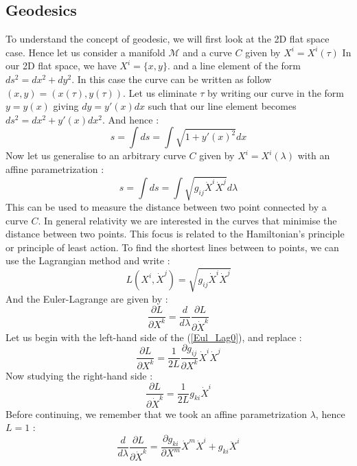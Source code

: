 \documentclass[a4paper,12pt]{article}
\theoremstyle{definition}
\begin{document}
\subsection{Geodesics}
To understand the concept of geodesic, we will first look at the 2D flat space case.
Hence let us consider a manifold $\mathcal{M}$ and a curve $C$ given by $X^i=X^i(\tau)$
In our 2D flat space, we have $X^i=\{x,y\}$. and a line element of the form $ds^2=dx^2+dy^2$.
In this case the curve can be written as follow $(x,y)=(x(\tau),y(\tau))$.
Let us eliminate $\tau$ by writing our curve in the form $y=y(x)$ giving $dy=y'(x)dx$ such that our line element becomes $ds^2=dx^2+y'(x)dx^2$.
And hence :
\begin{equation}
	s=\int ds=\int \sqrt{1+y'(x)^2}dx
\end{equation}
Now let us generalise to an arbitrary curve $C$ given by $X^i=X^i(\lambda)$ with an affine parametrization :
\begin{equation}
	s=\int ds=\int \sqrt{g_{ij}\dot{X}^i\dot{X}^j}d\lambda
\end{equation}
This can be used to measure the distance between two point connected by a curve $C$.
In general relativity we are interested in the curves that minimise the distance between two points.
This focus is related to the Hamiltonian's principle or principle of least action.
To find the shortest lines between to points, we can use the Lagrangian method and write :
\begin{equation}
	L(X^i,\dot{X}^j)=\sqrt{g_{ij}\dot{X}^i\dot{X}^j}
\end{equation}
And the Euler-Lagrange are given by :
\begin{equation}\label{Eul_Lag0}
	\frac{\partial L}{\partial X^k}=\frac{d}{d\lambda}\frac{\partial L}{\partial \dot{X}^k}
\end{equation}
Let us begin with the left-hand side of the (\ref{Eul_Lag0}), and replace :
\begin{equation}
	\frac{\partial L}{\partial X^k}=\frac{1}{2L}\frac{\partial g_{ij}}{\partial X^k}\dot{X}^i\dot{X}^j
\end{equation}
Now studying the right-hand side :
\begin{equation}
	\frac{\partial L}{\partial \dot{X}^k}=\frac{1}{2L}g_{ki}\dot{X}^i
\end{equation}
Before continuing, we remember that we took an affine parametrization $\lambda$, hence $L=1$ :
\begin{equation}
	\frac{d}{d\lambda}\frac{\partial L}{\partial \dot{X}^k}=
	\frac{\partial g_{ki}}{\partial X^m}\dot{X}^m\dot{X}^i+g_{ki}\ddot{X}^i
\end{equation}
\end{document}

